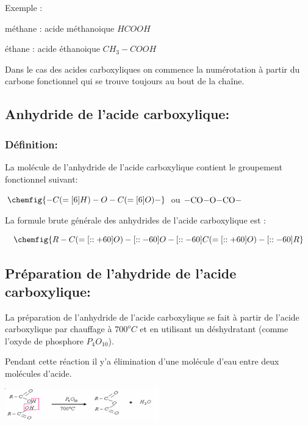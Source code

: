 \documentclass[12pt]{article}
\begin{document}
Exemple : 

méthane : acide méthanoique $HCOOH$

éthane : acide éthanoique $CH_3-COOH$
\begin{tcolorbox}[colback=pink!10!white,
                  colframe=blue!15!gray,
                  title=Remarque  -1- :
                 ]
Dans le cas des acides carboxyliques on commence la numérotation à partir du carbone fonctionnel qui se trouve toujours au bout de la chaîne.


			 \end{tcolorbox}


\subsection{Anhydride de l'acide carboxylique:}
\subsubsection{Définition:}
La molécule de l'anhydride de l'acide carboxylique contient le groupement fonctionnel suivant:
\begin{center}
	$\chemfig{-C(=[6]H)-O-C(=[6]O)-}$ ou $\ce{-CO-O-CO-}$

\end{center}
La formule brute générale des anhydrides de l'acide carboxylique est :

$$\chemfig{R-C(=[::+60]O)-[::-60]O-[::-60]C(=[::+60]O)-[::-60]R}$$

\subsection{Préparation de l'ahydride de l'acide carboxylique:}

La préparation de l'anhydride de l'acide carboxylique se fait à partir de l'acide carboxylique par chauffage à $700^oC$
et en utilisant un déshydratant (comme l'oxyde de phosphore $P_4O_{10}$).

Pendant cette réaction il y'a élimination d'une molécule d'eau entre deux molécules d'acide.

\begin{center}
	\includegraphics[width=0.5\textwidth]{./img/anydr.png}

\end{center}
\end{document}
